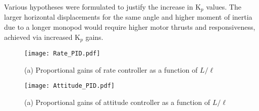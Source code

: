 \documentclass[12pt,a4paper]{article}
\begin{document}
Various hypotheses were formulated to justify the increase in K$_p$ values. The larger horizontal displacements for the same angle and higher moment of inertia due to a longer monopod would require higher motor thrusts and responsiveness, achieved via increased K$_p$ gains.

\begin{figure}[h!]
\centering
 \texttt{[image: Rate\_PID.pdf]}
  \caption{(a) Proportional gains of rate controller as a function of $L/\ell$}
  \label{fig15}
\end{figure}

\begin{figure}[h!]
\centering
\texttt{[image: Attitude\_PID.pdf]}
  \caption{(a) Proportional gains of attitude controller as a function of $L/\ell$}
  \label{fig16}
\end{figure}
\end{document}
